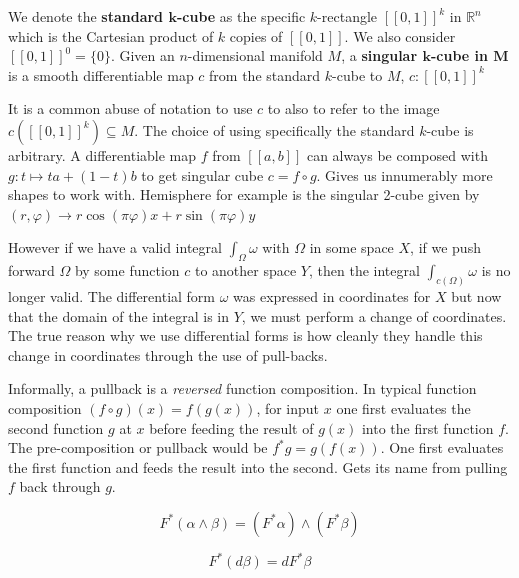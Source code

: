 \begin{definition}
	We denote the \textbf{standard $\boldsymbol{k}$-cube} as the specific $k$-rectangle $[\![0,1]\!]^k$ in 	
	$\mathbb{R}^n$ which is the Cartesian product of $k$ copies of $[\![0,1]\!]$.
	We also consider $[\![0,1]\!]^0 = \{0\}$.
	Given an $n$-dimensional manifold $M$, a \textbf{singular $\boldsymbol{k}$-cube in $\boldsymbol{M}$} is a 
	smooth differentiable map $c$ from the standard $k$-cube to $M$, $c:[\![0,1]\!]^k$
\end{definition}


It is a common abuse of notation to use $c$ to also to refer to the image $c( [\![ 0,1]\!]^k ) \subseteq M$.
The choice of using specifically the standard $k$-cube is arbitrary.
A differentiable map $f$ from $[\![a,b]\!]$ can always be composed with $g:t \mapsto ta +(1-t)b$ 
to get singular cube $c=f \circ g$.
Gives us innumerably more shapes to work with.
Hemisphere for example is the singular 2-cube given by $(r, \varphi) \to r \cos(\pi \varphi) x+ r \sin(\pi \varphi) y$


However if we have a valid integral $\int_{\Omega} \omega$ with $\Omega$ in some space $X$, 
if we push forward $\Omega$ by some function $c$ to another space $Y$, 
then the integral $\int_{c(\Omega)} \omega$ is no longer valid.
The differential form $\omega$ was expressed in coordinates for $X$ but now that the domain of the integral is in $Y$,
we must perform a change of coordinates.
The true reason why we use differential forms is how cleanly they handle this change in coordinates 
through the use of pull-backs.

Informally, a pullback is a \emph{reversed} function composition.
In typical function composition $(f \circ g)(x) = f(g(x))$, for input $x$ one first evaluates the second function $g$ at $x$
before feeding the result of $g(x)$ into the first function $f$.
The pre-composition or pullback would be $f^*g = g(f(x))$. 
One first evaluates the first function and feeds the result into the second.
Gets its name from pulling $f$ back through $g$.



\begin{equation}
F^* (\alpha \wedge \beta ) = (F^* \alpha) \wedge (F^* \beta)
\end{equation}

\begin{equation}
F^* (d \beta ) = dF^* \beta
\end{equation}

